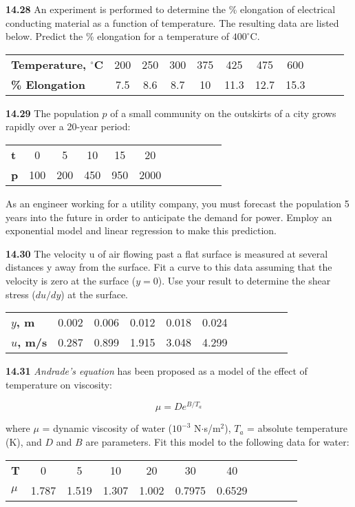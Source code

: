 \documentclass[../main.tex]{subfiles}
\begin{document}
\begin{multicols}{2}
	\noindent\textbf{14.28} An experiment is performed to determine the \% elongation of electrical conducting material as a function of temperature. The resulting data are listed below. Predict the \%
	elongation for a temperature of $400^\circ$C.

	\noindent \begin{tabular}{l c c c c c c c c c c}
		\textbf{Temperature, $^\circ$C} & 200 & 250 & 300 & 375 & 425 & 475 & 600 \\
		\textbf{\% Elongation} & 7.5 & 8.6 & 8.7 & 10 & 11.3 & 12.7 & 15.3
	\end{tabular}

	\noindent\textbf{14.29} The population $p$ of a small community on the outskirts of a city grows rapidly over a 20-year period:

	\noindent \begin{tabular}{l c c c c c c c c c c}
		\textbf{t} & 0 & 5 & 10 & 15 & 20 \\
		\textbf{p} & 100 & 200 & 450 & 950 & 2000
	\end{tabular}

	\noindent As an engineer working for a utility company, you must
	forecast the population 5 years into the future in order to anticipate the demand for power. Employ an exponential
	model and linear regression to make this prediction.

	\noindent\textbf{14.30} The velocity u of air flowing past a flat surface is
	measured at several distances y away from the surface. Fit a
	curve to this data assuming that the velocity is zero at the
	surface ($y = 0$). Use your result to determine the shear stress
	($du/dy$) at the surface.

	\noindent \begin{tabular}{l c c c c c c c c c c}
		\textbf{$y$, m} & 0.002 & 0.006 & 0.012 & 0.018 & 0.024 \\
		\textbf{$u$, m/s} & 0.287 & 0.899 & 1.915 & 3.048 & 4.299
	\end{tabular}

	\noindent\textbf{14.31} \textit{Andrade's equation} has been proposed as a model of the effect of temperature on viscosity:

	$$ \mu = De^{B/T_a}$$

	\noindent where $\mu$ = dynamic viscosity of water ($10^{-3}$ N$\cdot$s/m$^2$), $T_a$ = absolute temperature (K), and $D$ and $B$ are parameters. Fit this model to the following data for water:

	\noindent \begin{tabular}{l c c c c c c c c c c}
		\textbf{T} & 0 & 5 & 10 & 20 & 30 & 40 \\
		\textbf{$\mu$} & 1.787 & 1.519 & 1.307 & 1.002 & 0.7975 & 0.6529
	\end{tabular}


\end{multicols}
\end{document}
